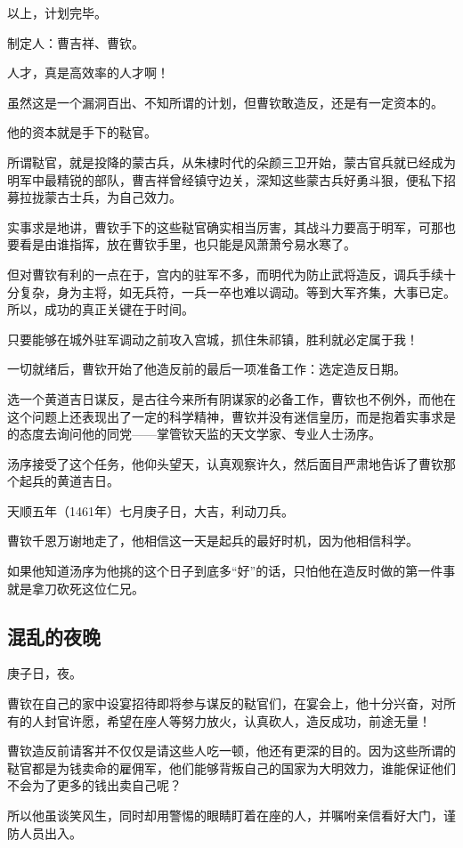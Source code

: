 \begin{multicols}{\theparacolNo}
		以上，计划完毕。

		制定人：曹吉祥、曹钦。

		人才，真是高效率的人才啊！

		虽然这是一个漏洞百出、不知所谓的计划，但曹钦敢造反，还是有一定资本的。

		他的资本就是手下的鞑官。

		所谓鞑官，就是投降的蒙古兵，从朱棣时代的朵颜三卫开始，蒙古官兵就已经成为明军中最精锐的部队，曹吉祥曾经镇守边关，深知这些蒙古兵好勇斗狠，便私下招募拉拢蒙古士兵，为自己效力。

		实事求是地讲，曹钦手下的这些鞑官确实相当厉害，其战斗力要高于明军，可那也要看是由谁指挥，放在曹钦手里，也只能是风萧萧兮易水寒了。

		但对曹钦有利的一点在于，宫内的驻军不多，而明代为防止武将造反，调兵手续十分复杂，身为主将，如无兵符，一兵一卒也难以调动。等到大军齐集，大事已定。所以，成功的真正关键在于时间。

		只要能够在城外驻军调动之前攻入宫城，抓住朱祁镇，胜利就必定属于我！

		一切就绪后，曹钦开始了他造反前的最后一项准备工作：选定造反日期。

		选一个黄道吉日谋反，是古往今来所有阴谋家的必备工作，曹钦也不例外，而他在这个问题上还表现出了一定的科学精神，曹钦并没有迷信皇历，而是抱着实事求是的态度去询问他的同党——掌管钦天监的天文学家、专业人士汤序。

		汤序接受了这个任务，他仰头望天，认真观察许久，然后面目严肃地告诉了曹钦那个起兵的黄道吉日。

		天顺五年（1461年）七月庚子日，大吉，利动刀兵。

		曹钦千恩万谢地走了，他相信这一天是起兵的最好时机，因为他相信科学。

		如果他知道汤序为他挑的这个日子到底多“好”的话，只怕他在造反时做的第一件事就是拿刀砍死这位仁兄。

		\subsection{混乱的夜晚}
		庚子日，夜。

		曹钦在自己的家中设宴招待即将参与谋反的鞑官们，在宴会上，他十分兴奋，对所有的人封官许愿，希望在座人等努力放火，认真砍人，造反成功，前途无量！

		曹钦造反前请客并不仅仅是请这些人吃一顿，他还有更深的目的。因为这些所谓的鞑官都是为钱卖命的雇佣军，他们能够背叛自己的国家为大明效力，谁能保证他们不会为了更多的钱出卖自己呢？

		所以他虽谈笑风生，同时却用警惕的眼睛盯着在座的人，并嘱咐亲信看好大门，谨防人员出入。


\end{multicols}
